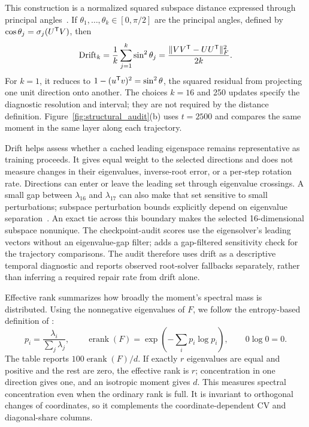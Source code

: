 This construction is a normalized squared subspace distance expressed through principal angles~\citep{bjorck1973angles,yu2015davis}. If $\theta_1,\ldots,\theta_k\in[0,\pi/2]$ are the principal angles, defined by $\cos\theta_j=\sigma_j(U^{{\mathsf{T}}}V)$, then
\[
 \mathrm{Drift}_k
 =\frac1k\sum_{j=1}^k\sin^2\theta_j
 =\frac{\|VV^{{\mathsf{T}}}-UU^{{\mathsf{T}}}\|_F^2}{2k}.
\]
For $k=1$, it reduces to $1-(u^{{\mathsf{T}}}v)^2=\sin^2\theta$, the squared residual from projecting one unit direction onto another. The choices $k=16$ and 250 updates specify the diagnostic resolution and interval; they are not required by the distance definition. Figure~\ref{fig:structural_audit}(b) uses $t=2500$ and compares the same moment in the same layer along each trajectory.

Drift helps assess whether a cached leading eigenspace remains representative as training proceeds. It gives equal weight to the selected directions and does not measure changes in their eigenvalues, inverse-root error, or a per-step rotation rate. Directions can enter or leave the leading set through eigenvalue crossings. A small gap between $\lambda_{16}$ and $\lambda_{17}$ can also make that set sensitive to small perturbations; subspace perturbation bounds explicitly depend on eigenvalue separation~\citep{yu2015davis}. An exact tie across this boundary makes the selected 16-dimensional subspace nonunique. The checkpoint-audit scores use the eigensolver's leading vectors without an eigenvalue-gap filter;  adds a gap-filtered sensitivity check for the trajectory comparisons. The audit therefore uses drift as a descriptive temporal diagnostic and reports observed root-solver fallbacks separately, rather than inferring a required repair rate from drift alone.

Effective rank summarizes how broadly the moment's spectral mass is distributed. Using the nonnegative eigenvalues of $F$, we follow the entropy-based definition of \citet{roy2007effective}:
\[
 p_i=\frac{\lambda_i}{\sum_j\lambda_j},\qquad
 \operatorname{erank}(F)=\exp\!\left(-\sum_i p_i\log p_i\right),
 \qquad 0\log0=0.
\]
The table reports $100\operatorname{erank}(F)/d$. If exactly $r$ eigenvalues are equal and positive and the rest are zero, the effective rank is $r$; concentration in one direction gives one, and an isotropic moment gives $d$. This measures spectral concentration even when the ordinary rank is full. It is invariant to orthogonal changes of coordinates, so it complements the coordinate-dependent CV and diagonal-share columns.

